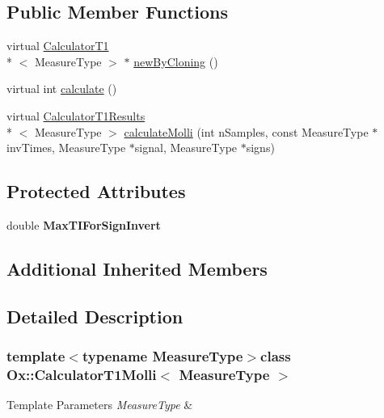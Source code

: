 \subsection*{Public Member Functions}
\begin{DoxyCompactItemize}
\item 
virtual \hyperlink{class_ox_1_1_calculator_t1}{Calculator\-T1}\\*
$<$ Measure\-Type $>$ $\ast$ \hyperlink{class_ox_1_1_calculator_t1_molli_ae0fde362fbe16c4c40dee96330b4a676}{new\-By\-Cloning} ()
\item 
virtual int \hyperlink{class_ox_1_1_calculator_t1_molli_ad6b1b36c0e06df8b1b05b06b4c1f10f1}{calculate} ()
\item 
virtual \hyperlink{struct_ox_1_1_calculator_t1_results}{Calculator\-T1\-Results}\\*
$<$ Measure\-Type $>$ \hyperlink{class_ox_1_1_calculator_t1_molli_aff65007fe06dbce9449fc42aead8a6bd}{calculate\-Molli} (int n\-Samples, const Measure\-Type $\ast$inv\-Times, Measure\-Type $\ast$signal, Measure\-Type $\ast$signs)
\end{DoxyCompactItemize}
\subsection*{Protected Attributes}
\begin{DoxyCompactItemize}
\item 
\hypertarget{class_ox_1_1_calculator_t1_molli_adb4f50cdf9dabf4890b4d28194d0522b}{double {\bfseries Max\-T\-I\-For\-Sign\-Invert}}\label{class_ox_1_1_calculator_t1_molli_adb4f50cdf9dabf4890b4d28194d0522b}

\end{DoxyCompactItemize}
\subsection*{Additional Inherited Members}


\subsection{Detailed Description}
\subsubsection*{template$<$typename Measure\-Type$>$class Ox\-::\-Calculator\-T1\-Molli$<$ Measure\-Type $>$}


\begin{DoxyTemplParams}{Template Parameters}
{\em Measure\-Type} & \\
\hline
\end{DoxyTemplParams}


